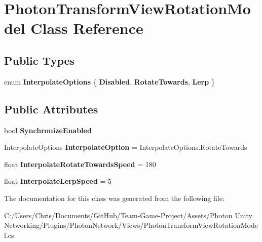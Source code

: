 \hypertarget{class_photon_transform_view_rotation_model}{}\section{Photon\+Transform\+View\+Rotation\+Model Class Reference}
\label{class_photon_transform_view_rotation_model}
\subsection*{Public Types}
\begin{DoxyCompactItemize}
\item 
enum {\bfseries Interpolate\+Options} \{ {\bfseries Disabled}, 
{\bfseries Rotate\+Towards}, 
{\bfseries Lerp}
 \}\hypertarget{class_photon_transform_view_rotation_model_a7cffd3d6b5754aea9940cb3a5c671494}{}\label{class_photon_transform_view_rotation_model_a7cffd3d6b5754aea9940cb3a5c671494}

\end{DoxyCompactItemize}
\subsection*{Public Attributes}
\begin{DoxyCompactItemize}
\item 
bool {\bfseries Synchronize\+Enabled}\hypertarget{class_photon_transform_view_rotation_model_a36cdb8874f88d786106aa6def2c00c4d}{}\label{class_photon_transform_view_rotation_model_a36cdb8874f88d786106aa6def2c00c4d}

\item 
Interpolate\+Options {\bfseries Interpolate\+Option} = Interpolate\+Options.\+Rotate\+Towards\hypertarget{class_photon_transform_view_rotation_model_a39016931d8896e4c8c4074b374d2278c}{}\label{class_photon_transform_view_rotation_model_a39016931d8896e4c8c4074b374d2278c}

\item 
float {\bfseries Interpolate\+Rotate\+Towards\+Speed} = 180\hypertarget{class_photon_transform_view_rotation_model_a025f87682b9d5436e209106aa3e843cb}{}\label{class_photon_transform_view_rotation_model_a025f87682b9d5436e209106aa3e843cb}

\item 
float {\bfseries Interpolate\+Lerp\+Speed} = 5\hypertarget{class_photon_transform_view_rotation_model_aef6a60daf9507129719aefc30dc45166}{}\label{class_photon_transform_view_rotation_model_aef6a60daf9507129719aefc30dc45166}

\end{DoxyCompactItemize}


The documentation for this class was generated from the following file\+:\begin{DoxyCompactItemize}
\item 
C\+:/\+Users/\+Chris/\+Documents/\+Git\+Hub/\+Team-\/\+Game-\/\+Project/\+Assets/\+Photon Unity Networking/\+Plugins/\+Photon\+Network/\+Views/Photon\+Transform\+View\+Rotation\+Model.\+cs\end{DoxyCompactItemize}
